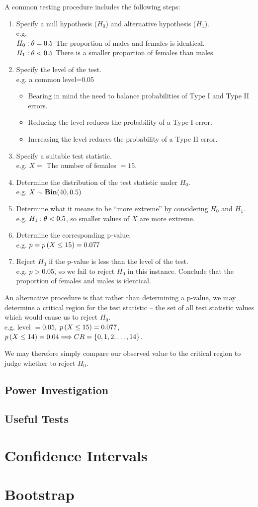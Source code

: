 A common testing procedure includes the following steps:
	\begin{enumerate}
		\item Specify a null hypothesis ($H_0$) and alternative hypothesis ($H_1$). \\ e.g. \\
		$H_0:\theta=0.5$ The proportion of males and females is identical. \\
		$H_1:\theta<0.5$ There is a smaller proportion of females than males.
		\item Specify the level of the test. \\ e.g. a common level=0.05
		\begin{itemize}[leftmargin=0.4cm,nosep]
			\item Bearing in mind the need to balance probabilities of Type I and Type II errors.
			\item Reducing the level reduces the probability of a Type I error.
			\item Increasing the level reduces the probability of a Type II error.
		\end{itemize}
		\item Specify a suitable test statistic. \\ e.g. $X=$ The number of females $=15$.
		\item Determine the distribution of the test statistic under $H_0$. \\ e.g. $X\sim\mathbf{Bin}(40,0.5)$
		\item Determine what it means to be ``more extreme'' by considering $H_0$ and $H_1$. \\ e.g. $H_1:\theta<0.5$, so smaller values of $X$ are more extreme.
		\item Determine the corresponding p-value. \\ e.g. $p=p\left(X\leq15\right)=0.077$
		\item Reject $H_0$ if the p-value is less than the level of the test. \\ e.g. $p>0.05$, so we fail to reject $H_0$ in this instance. Conclude that the proportion of females and males is identical.
	\end{enumerate}

An alternative procedure is that rather than determining a p-value, we may determine a critical region for the test statistic -- the set of all test statistic values which would cause us to reject $H_0$. \\ e.g. level $=0.05$, $p\left(X\leq15\right)=0.077$, $p\left(X\leq14\right)=0.04 \Longrightarrow CR=\{0,1,2,\dotsc,14\}$.

We may therefore simply compare our observed value to the critical region to judge whether to reject $H_0$.

\subsection{Power Investigation}

\subsection{Useful Tests}

\section{Confidence Intervals}

\section{Bootstrap}